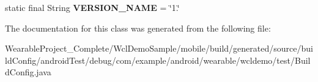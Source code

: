 \begin{DoxyCompactItemize}
\item 
static final String {\bfseries V\+E\+R\+S\+I\+O\+N\+\_\+\+N\+A\+ME} = \char`\"{}1.\char`\"{}\hypertarget{classcom_1_1example_1_1android_1_1wearable_1_1wcldemo_1_1test_1_1BuildConfig_a70925a0b63c7de8550c722884846150a}{}\label{classcom_1_1example_1_1android_1_1wearable_1_1wcldemo_1_1test_1_1BuildConfig_a70925a0b63c7de8550c722884846150a}

\end{DoxyCompactItemize}


The documentation for this class was generated from the following file\+:\begin{DoxyCompactItemize}
\item 
Wearable\+Project\+\_\+\+Complete/\+Wcl\+Demo\+Sample/mobile/build/generated/source/build\+Config/android\+Test/debug/com/example/android/wearable/wcldemo/test/Build\+Config.\+java\end{DoxyCompactItemize}
